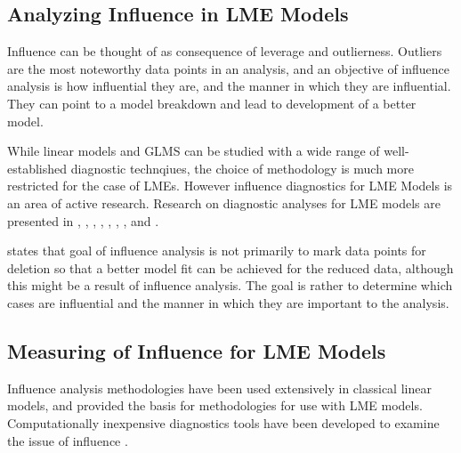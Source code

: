 \documentclass[12pt, a4paper]{report}
\theoremstyle{definition}
\theoremstyle{remark}
\begin{document}
\subsection{Analyzing Influence in LME Models}

Influence can be thought of as consequence of leverage and outlierness. Outliers are the most noteworthy data points in an analysis, and an objective of influence analysis is how influential they are, and the manner in which they are influential. They can point to a model breakdown and lead to development of a better model.

While linear models and GLMS can be studied with a wide range of well-established diagnostic technqiues, the choice of methodology is much more restricted for the case of LMEs. However
influence diagnostics for LME Models is an area of active research. Research on diagnostic analyses for LME models are presented in \citet{Beckman}, 
\citet{Christensen}, \citet{hilden1995}, \citet{lesaffre1998local}, \citet{Banerjee1997}, 
\citet{fung2002}, \citet{Demi}, \citet{Zewotir} and \citet{NobreSinger2007, NobreSinger2011}.



\citet{schabenberger} states that goal of influence analysis is not primarily to mark data points for deletion so that a better model fit can be achieved for the reduced data, although this might be a result of influence analysis. The goal is rather to determine which cases are influential and the manner in which they are important to the analysis. 




%



\subsection{Measuring of Influence for LME Models}
Influence analysis methodologies have been used extensively in classical linear models, and provided the basis for methodologies for use with LME models. Computationally inexpensive diagnostics tools have been developed to examine the issue of influence \citep{Zewotir}. 
\end{document}

